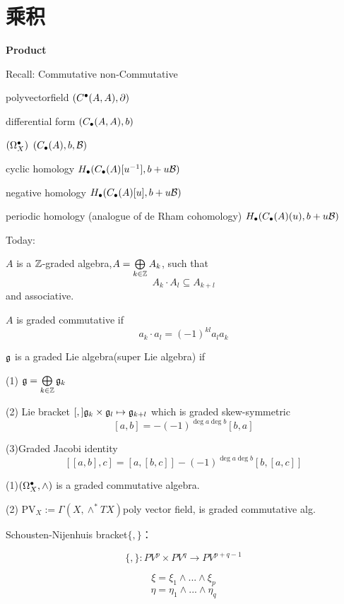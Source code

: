 \chapter{乘积}

\textbf{Product}

Recall:
Commutative                 non-Commutative

polyvectorfield             $(C^{\bullet}(A,A),\partial)$

differential form           $(C_{\bullet}(A,A),b)$

$(\Omega_X^{\bullet})$            $(C_{\bullet}(A),b,\mathcal{B})$

cyclic homology  $H_{\bullet}(C_{\bullet}(A)[u^{-1}],b+u\mathcal{B})$

negative homology  $H_{\bullet}(C_{\bullet}(A)[u],b+u\mathcal{B})$

periodic homology  (analogue of de Rham cohomology)
$H_{\bullet}(C_{\bullet}(A)(u),b+u\mathcal{B})$

Today:

\begin{definition}
$A$ is a $\mathbb{Z}$-graded algebra,$A=\bigoplus\limits_{k\in\mathbb{Z}}A_k$,
such that
$$A_k\cdot A_l\subseteq A_{k+l}$$
and associative.

$A$ is graded commutative if
$$a_k\cdot a_l=(-1)^{kl}a_la_k$$
\end{definition}

\begin{definition}
$\mathfrak{g}$ is a graded Lie algebra(super Lie algebra)
if

(1) $\mathfrak{g}=\bigoplus\limits_{k\in\mathbb{Z}}\mathfrak{g}_k$

(2) Lie bracket $[,] \mathfrak{g}_k\times\mathfrak{g}_l\mapsto\mathfrak{g}_{k+l}$
which is graded skew-symmetric
$$[a,b]=-(-1)^{\deg a\deg b}[b,a]$$

(3)Graded Jacobi identity
$$[[a,b],c]=[a,[b,c]]-(-1)^{\deg a\deg b}[b,[a,c]]$$
\end{definition}


\begin{example}
(1)$(\Omega_X^{\bullet},\wedge)$ is a graded commutative algebra.

(2) $\text{PV}_X:=\Gamma(X,\wedge^*TX)$poly vector field,
is graded commutative alg.
\end{example}

Schousten-Nijenhuis bracket$\{,\}$：

$$\{,\}:PV^p\times PV^q\to PV^{p+q-1}$$

$$\xi=\xi_1\wedge...\wedge\xi_p$$
$$\eta=\eta_1\wedge...\wedge\eta_q$$

